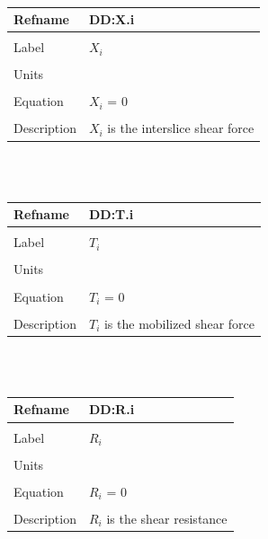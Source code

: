 \documentclass[12pt]{article}
\begin{document}
~\newline
\noindent \begin{minipage}{\textwidth}
\begin{tabular}{p{} p{}}
\toprule \textbf{Refname} & \textbf{DD:X.i}
\label{DD:X.i}
\\ \midrule \\
Label & $X_{i}$
\\ \midrule \\
Units & 
\\ \midrule \\
Equation & $X_{i}$ = $0$
\\ \midrule \\
Description & $X_{i}$ is the interslice shear force
\\ \bottomrule \end{tabular}
\end{minipage}\\
~\newline
\noindent \begin{minipage}{\textwidth}
\begin{tabular}{p{} p{}}
\toprule \textbf{Refname} & \textbf{DD:T.i}
\label{DD:T.i}
\\ \midrule \\
Label & $T_{i}$
\\ \midrule \\
Units & 
\\ \midrule \\
Equation & $T_{i}$ = $0$
\\ \midrule \\
Description & $T_{i}$ is the mobilized shear force
\\ \bottomrule \end{tabular}
\end{minipage}\\
~\newline
\noindent \begin{minipage}{\textwidth}
\begin{tabular}{p{} p{}}
\toprule \textbf{Refname} & \textbf{DD:R.i}
\label{DD:R.i}
\\ \midrule \\
Label & $R_{i}$
\\ \midrule \\
Units & 
\\ \midrule \\
Equation & $R_{i}$ = $0$
\\ \midrule \\
Description & $R_{i}$ is the shear resistance
\\ \bottomrule \end{tabular}
\end{minipage}\\
\end{document}
